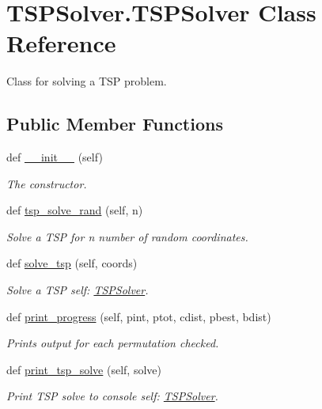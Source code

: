 \hypertarget{classTSPSolver_1_1TSPSolver}{}\section{T\+S\+P\+Solver.\+T\+S\+P\+Solver Class Reference}
\label{classTSPSolver_1_1TSPSolver}


Class for solving a T\+SP problem.  


\subsection*{Public Member Functions}
\begin{DoxyCompactItemize}
\item 
def \hyperlink{classTSPSolver_1_1TSPSolver_abf7f291bbc7705ba2661f297adce9dfc}{\+\_\+\+\_\+init\+\_\+\+\_\+} (self)
\begin{DoxyCompactList}\small\item\em The constructor. \end{DoxyCompactList}\item 
def \hyperlink{classTSPSolver_1_1TSPSolver_a1263394b1d33b7c4457cf07fd84baae2}{tsp\+\_\+solve\+\_\+rand} (self, n)
\begin{DoxyCompactList}\small\item\em Solve a T\+SP for n number of random coordinates. \end{DoxyCompactList}\item 
def \hyperlink{classTSPSolver_1_1TSPSolver_a0f5c8546f937bcf4c58e523ac65a39a8}{solve\+\_\+tsp} (self, coords)
\begin{DoxyCompactList}\small\item\em Solve a T\+SP  self\+: \hyperlink{classTSPSolver_1_1TSPSolver}{T\+S\+P\+Solver}. \end{DoxyCompactList}\item 
def \hyperlink{classTSPSolver_1_1TSPSolver_a3432ac3c40a016a0b4bf72d4e75d4a7f}{print\+\_\+progress} (self, pint, ptot, cdist, pbest, bdist)
\begin{DoxyCompactList}\small\item\em Prints output for each permutation checked. \end{DoxyCompactList}\item 
def \hyperlink{classTSPSolver_1_1TSPSolver_ac5d8950f2349d0d1f98c810e8d43c6cc}{print\+\_\+tsp\+\_\+solve} (self, solve)
\begin{DoxyCompactList}\small\item\em Print T\+SP solve to console  self\+: \hyperlink{classTSPSolver_1_1TSPSolver}{T\+S\+P\+Solver}. \end{DoxyCompactList}\end{DoxyCompactItemize}
